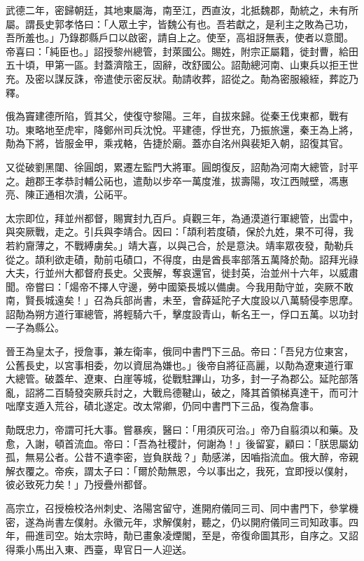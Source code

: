 \begin{pinyinscope}
 武德二年，密歸朝廷，其地東屬海，南至江，西直汝，北抵魏郡，勣統之，未有所屬。謂長史郭孝恪曰：「人眾土宇，皆魏公有也。吾若獻之，是利主之敗為己功，吾所羞也。」乃錄郡縣戶口以啟密，請自上之。使至，高祖訝無表，使者以意聞。帝喜曰：「純臣也。」詔授黎州總管，封萊國公。賜姓，附宗正屬籍，徙封曹，給田五十頃，甲第一區。封蓋濟陰王，固辭，改舒國公。詔勣總河南、山東兵以拒王世充。及密以謀反誅，帝遣使示密反狀。勣請收葬，詔從之。勣為密服縗絰，葬訖乃釋。



 俄為竇建德所陷，質其父，使復守黎陽。三年，自拔來歸。從秦王伐東都，戰有功。東略地至虎牢，降鄭州司兵沈悅。平建德，俘世充，乃振旅還，秦王為上將，勣為下將，皆服金甲，乘戎輅，告捷於廟。蓋亦自洺州與裴矩入朝，詔復其官。



 又從破劉黑闥、徐圓朗，累遷左監門大將軍。圓朗復反，詔勣為河南大總管，討平之。趙郡王孝恭討輔公祏也，遣勣以步卒一萬度淮，拔壽陽，攻江西賊壁，馮惠亮、陳正通相次潰，公祏平。



 太宗即位，拜並州都督，賜實封九百戶。貞觀三年，為通漠道行軍總管，出雲中，與突厥戰，走之。引兵與李靖合。因曰：「頡利若度磧，保於九姓，果不可得，我若約齎薄之，不戰縛虜矣。」靖大喜，以與己合，於是意決。靖率眾夜發，勣勒兵從之。頡利欲走磧，勣前屯磧口，不得度，由是酋長率部落五萬降於勣。詔拜光祿大夫，行並州大都督府長史。父喪解，奪哀還官，徙封英，治並州十六年，以威肅聞。帝嘗曰：「煬帝不擇人守邊，勞中國築長城以備虜。今我用勣守並，突厥不敢南，賢長城遠矣！」召為兵部尚書，未至，會薛延陀子大度設以八萬騎侵李思摩。詔勣為朔方道行軍總管，將輕騎六千，擊度設青山，斬名王一，俘口五萬。以功封一子為縣公。



 晉王為皇太子，授詹事，兼左衛率，俄同中書門下三品。帝曰：「吾兒方位東宮，公舊長史，以宮事相委，勿以資屈為嫌也。」後帝自將征高麗，以勣為遼東道行軍大總管。破蓋牟、遼東、白崖等城，從戰駐蹕山，功多，封一子為郡公。延陀部落亂，詔將二百騎發突厥兵討之，大戰烏德鞬山，破之，降其首領梯真達干，而可汁咄摩支遁入荒谷，磧北遂定。改太常卿，仍同中書門下三品，復為詹事。



 勣既忠力，帝謂可托大事。嘗暴疾，醫曰：「用須灰可治。」帝乃自翦須以和藥。及愈，入謝，頓首流血。帝曰：「吾為社稷計，何謝為！」後留宴，顧曰：「朕思屬幼孤，無易公者。公昔不遺李密，豈負朕哉？」勣感涕，因嚙指流血。俄大醉，帝親解衣覆之。帝疾，謂太子曰：「爾於勣無恩，今以事出之，我死，宜即授以僕射，彼必致死力矣！」乃授疊州都督。



 高宗立，召授檢校洛州刺史、洛陽宮留守，進開府儀同三司、同中書門下，參掌機密，遂為尚書左僕射。永徽元年，求解僕射，聽之，仍以開府儀同三司知政事。四年，冊進司空。始太宗時，勣已畫象凌煙閣，至是，帝復命圖其形，自序之。又詔得乘小馬出入東、西臺，卑官日一人迎送。




\end{pinyinscope}
